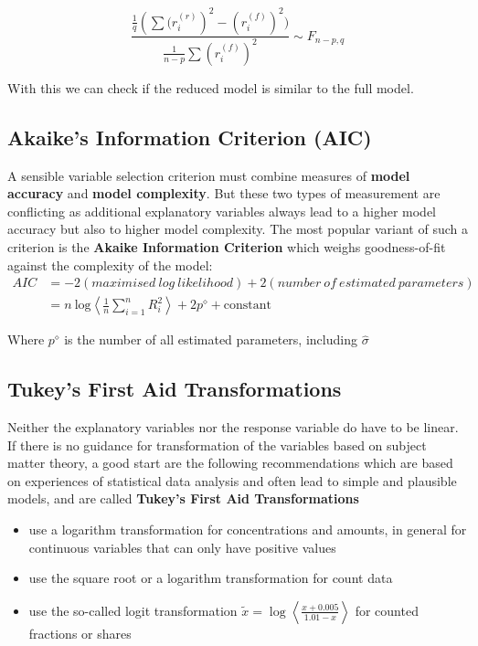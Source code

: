 \documentclass[11pt]{article}
\begin{document}
\begin{equation*}
    \frac{\frac{1}{q}(\sum{(r_i^{(r)}})^2 - (r_i^{(f)})^2)}{\frac{1}{n-p}\sum{(r_i^{(f)})^2}} \sim F_{n-p,q}
\end{equation*}

With this we can check if the reduced model is similar to the full model.

\subsection{Akaike's Information Criterion (AIC)}
A sensible variable selection criterion must combine measures of \textbf{model accuracy} and \textbf{model complexity}. But these two types of measurement are conflicting as additional explanatory variables always lead to a higher model accuracy but also to higher model complexity. The most popular variant of such a criterion is the \textbf{Akaike Information Criterion} which weighs goodness-of-fit against the complexity of the model:
\begin{align*}
	AIC &= -2 (maximised\ log\ likelihood) + 2 (number\ of\ estimated\ parameters)\\
	&= n\ \text{log}\left\langle \frac{1}{n}\sum_{i=1}^{n}R_i^2\right\rangle + 2 p^\diamond + \text{constant}
\end{align*}

Where $p^\diamond$ is the number of all estimated parameters, including $\widehat{\sigma}$

\subsection{Tukey's First Aid Transformations}
Neither the explanatory variables nor the response variable do have to be linear. If there is no guidance for transformation of the variables based on subject matter theory, a good start are the following recommendations which are based on experiences of statistical data analysis and often lead to simple and plausible models, and are called \textbf{Tukey's First Aid Transformations}
\begin{itemize}[label=-]
	\item use a logarithm transformation for concentrations and amounts, in general for continuous variables that can only have positive values
	\item use the square root or a logarithm transformation for count data
	\item use the so-called logit transformation $\tilde{x} = \log\left\langle \frac{x+0.005}{1.01-x} \right\rangle$ for counted fractions or shares
\end{itemize}
\end{document}
